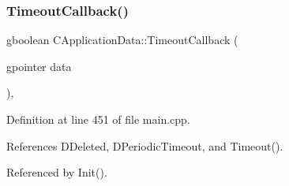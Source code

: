 \subsubsection{\texorpdfstring{Timeout\+Callback()}{TimeoutCallback()}}
{\footnotesize\ttfamily gboolean C\+Application\+Data\+::\+Timeout\+Callback (\begin{DoxyParamCaption}\item[{gpointer}]{data }\end{DoxyParamCaption})\hspace{0.3cm}{\ttfamily [static]}, {\ttfamily [protected]}}



Definition at line 451 of file main.\+cpp.



References D\+Deleted, D\+Periodic\+Timeout, and Timeout().



Referenced by Init().


